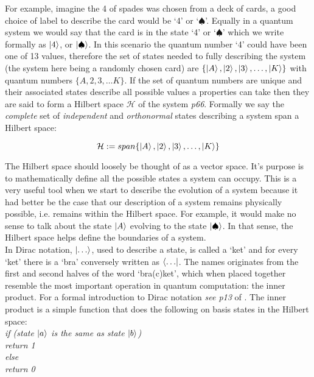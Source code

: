 For example, imagine the 4 of spades was chosen from a deck of cards, a good choice of label to describe the card would be `4' or `$\spadesuit$'. Equally in a quantum system we would say that the card is in the state `4' or `$\spadesuit$' which we write formally as $\left\vert{4}\right\rangle$, or $\left\vert{\spadesuit}\right\rangle$. In this scenario the quantum number `4' could have been one of 13 values, therefore the set of states needed to fully describing the system (the system here being a randomly chosen card) are $\{\left\vert{A}\right\rangle, \left\vert{2}\right\rangle, \left\vert{3}\right\rangle,\ldots ,\left\vert{K}\right\rangle\}$ with quantum numbers $\{A,2,3,\ldots K\}$. If the set of quantum numbers are unique and their associated states describe all possible values a properties can take then they are said to form a Hilbert space $\mathcal{H}$ of the system \cite{nielsen_chuang_2010} \textit{p66}. Formally we say the \textit{complete} set of \textit{independent} and \textit{orthonormal} states describing a system span a Hilbert space:

\begin{equation}
\mathcal{H}:=span\{\left\vert{A}\right\rangle, \left\vert{2}\right\rangle, \left\vert{3}\right\rangle,\ldots ,\left\vert{K}\right\rangle\}
\end{equation}

The Hilbert space should loosely be thought of as a vector space. It's purpose is to mathematically define all the possible states a system can occupy. This is a very useful tool when we start to describe the evolution of a system because it had better be the case that our description of a system remains physically possible, i.e. remains within the Hilbert space. For example, it would make no sense to talk about the state $\left\vert{A}\right\rangle$ evolving to the state $\left\vert{\spadesuit}\right\rangle$. In that sense, the Hilbert space helps define the boundaries of a system.\\

In Dirac notation, $\left\vert{\ldots}\right\rangle$, used to describe a state, is called a `ket' and for every `ket' there is a `bra' conversely written as $\left\langle{\ldots}\right\vert$. The names originates from the first and second halves of the word `bra(c)ket', which when placed together resemble the most important operation in quantum computation: the inner product. For a formal introduction to Dirac notation \textit{see p13} of \cite{nielsen_chuang_2010}. The inner product is a simple function that does the following on basis states in the Hilbert space:\\

\textit{if (state $\left\vert{a}\right\rangle$ is the same as state $\left\vert{b}\right\rangle$)\\ 
    return 1 \\
else \\
    return 0}\\ 

